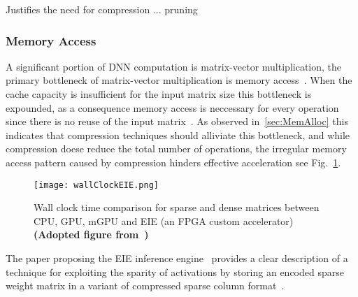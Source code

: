 \documentclass[../../D1.tex]{subfiles}
\begin{document}
Justifies the need for compression ... pruning


\subsubsection{Memory Access}
A significant portion of DNN computation is matrix-vector multiplication, the primary bottleneck of matrix-vector multiplication is memory access~\autocite{qiuGoingDeeperEmbedded2016}. 
When the cache capacity is insufficient for the input matrix size this bottleneck is expounded, as a consequence memory access is neccessary for every operation since there is no reuse of the input matrix~\autocite{hanEIEEfficientInference2016}.
As observed in~\ref{sec:MemAlloc} this indicates that compression techniques should alliviate this bottleneck, and while compression doese reduce the total number of operations, the irregular memory access pattern caused by compression hinders effective acceleration see Fig.~\ref{fig:wallClockEIE}.

\begin{figure}[H]
    \texttt{[image: wallClockEIE.png]} 
    \caption{Wall clock time comparison for sparse and dense matrices between CPU, GPU, mGPU and EIE (an FPGA custom accelerator)\\ \textbf{(Adopted figure from~\autocite{hanEIEEfficientInference2016})}}
    \label{fig:wallClockEIE}   
\end{figure}

The paper proposing the EIE inference engine~\autocite{hanEIEEfficientInference2016} provides a clear description of a technique for exploiting the sparity of activations by storing an encoded sparse weight matrix in a variant of compressed sparse column format~\autocite{vuducAutomaticPerformanceTuning}.
\end{document}
